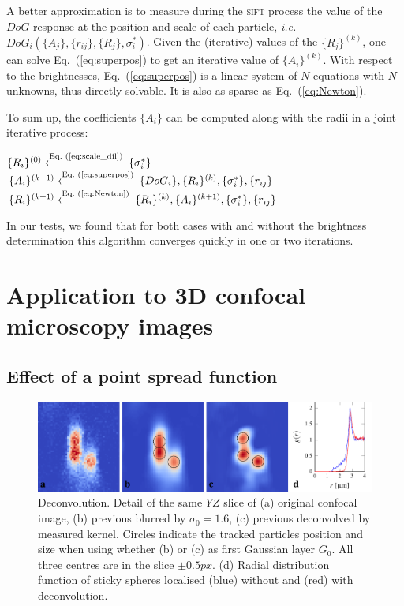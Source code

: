 \documentclass[8.5pt,twoside,twocolumn]{article}
\begin{document}
A better approximation is to measure during the \textsc{sift} process the value of the $DoG$ response at the position and scale of each particle, \emph{i.e.} $DoG_i(\lbrace A_j\rbrace, \lbrace r_{ij}\rbrace, \lbrace R_j\rbrace, \sigma_i^*)$. Given the (iterative) values of the $\lbrace R_j\rbrace^{(k)}$, one can solve Eq.~(\ref{eq:superpos}) to get an iterative value of $\lbrace A_i\rbrace^{(k)}$. With respect to the brightnesses, Eq.~(\ref{eq:superpos}) is a linear system of $N$ equations with $N$ unknowns, thus directly solvable. It is also as sparse as Eq.~(\ref{eq:Newton}).

To sum up, the coefficients $\lbrace A_i\rbrace$ can be computed along with the radii in a joint iterative process:
\begin{algorithmic}
\State $\lbrace R_i\rbrace^{(0)} \xleftarrow{\text{Eq.~(\ref{eq:scale_dil})}} \lbrace \sigma_i^*\rbrace$
\Repeat 
	\State $\lbrace A_i\rbrace^{(k+1)} \xleftarrow{\text{Eq.~(\ref{eq:superpos})}} \lbrace DoG_i \rbrace, \lbrace R_i\rbrace^{(k)}, \lbrace \sigma_i^*\rbrace, \lbrace r_{ij}\rbrace$
	\State $\lbrace R_i\rbrace^{(k+1)} \xleftarrow{\text{Eq.~(\ref{eq:Newton})}} \lbrace R_i\rbrace^{(k)}, \lbrace A_i\rbrace^{(k+1)}, \lbrace \sigma_i^*\rbrace, \lbrace r_{ij}\rbrace$ 
\end{algorithmic}

In our tests, we found that for both cases with and without the brightness determination this algorithm converges quickly in one or two iterations.

\section{Application to 3D confocal microscopy images}
\label{sec:confocal}

\subsection{Effect of a point spread function}
\begin{figure}
\centering
\includegraphics{fig_deconv.pdf}
	\caption{Deconvolution. Detail of the same $YZ$ slice of (a) original confocal image, (b) previous blurred by $\sigma_0=1.6$, (c) previous deconvolved by measured kernel. Circles indicate the tracked particles position and size when using whether (b) or (c) as first Gaussian layer $G_0$. All three centres are in the slice $\pm \unit{0.5}{px}$. (d) Radial distribution function of sticky spheres localised (blue) without and (red) with deconvolution.}
	\label{fig:deconv}
\end{figure}
\end{document}
